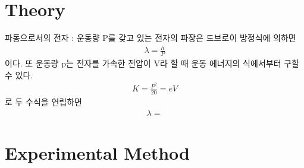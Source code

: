 \documentclass[a4paper, 10pt, nanum]{CSUniSchoolLabReport}
\begin{document}

\section{Theory}


	파동으로서의 전자 : 운동량 P를 갖고 있는 전자의 파장은 드브로이 방정식에 의하면
	\begin{align}
		\lambda = \frac{h}{P}
	\end{align}
	이다. 또 운동량 p는 전자를 가속한 전압이 V라 할 때 운동 에너지의 식에서부터 구할 수 있다.
	\begin{align}
		K = \frac{P^2}{20} = eV
	\end{align}
	로 두 수식을 연립하면
	\begin{align}
		\lambda = 
	\end{align}


\section{Experimental Method}
\end{document}

